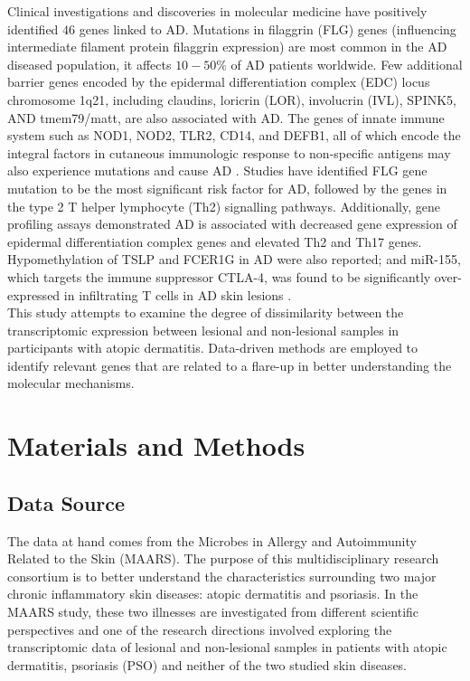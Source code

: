 \documentclass[journal, a4paper]{IEEEtran}
\begin{document}
Clinical investigations and discoveries in molecular medicine have positively identified $46$ genes linked to AD. Mutations in filaggrin (FLG) genes (influencing intermediate filament protein filaggrin expression) are most common in the AD diseased population, it affects $10-50\%$ of AD patients worldwide. Few additional barrier genes encoded by the epidermal differentiation complex (EDC) locus chromosome 1q21, including claudins, loricrin (LOR), involucrin (IVL), SPINK5, AND tmem79/matt, are also associated with AD. The genes of innate immune system such as NOD1, NOD2, TLR2, CD14, and DEFB1, all of which encode the integral factors in cutaneous immunologic response to non-specific antigens may also experience mutations and cause AD \cite{guttman2017atopic}. Studies have identified FLG gene mutation to be the most significant risk factor for AD, followed by the genes in the type 2 T helper lymphocyte (Th2) signalling pathways. Additionally, gene profiling assays demonstrated AD is associated with decreased gene expression of epidermal differentiation complex genes and elevated Th2 and Th17 genes. Hypomethylation of TSLP and FCER1G in AD were also reported; and miR-155, which targets the immune suppressor CTLA-4, was found to be significantly over-expressed in infiltrating T cells in AD skin lesions \cite{guttman2017atopic, bin2016genetic}.\\

This study attempts to examine the degree of dissimilarity between the transcriptomic expression between lesional and non-lesional samples in participants with atopic dermatitis. Data-driven methods are employed to identify relevant genes that are related to a flare-up in better understanding the molecular mechanisms.

\section{Materials and Methods}

\subsection{Data Source}

The data at hand comes from the Microbes in Allergy and Autoimmunity Related to the Skin (MAARS). The purpose of this multidisciplinary research consortium is to better understand the characteristics surrounding two major chronic inflammatory skin diseases: atopic dermatitis and psoriasis\cite{MAARS}. In the MAARS study, these two illnesses are investigated from different scientific perspectives and one of the research directions involved exploring the transcriptomic data of lesional and non-lesional samples in patients with atopic dermatitis, psoriasis (PSO) and neither of the two studied skin diseases.
\end{document}
